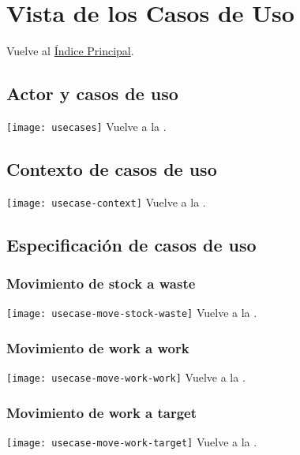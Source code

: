 \newpage{}
\section{Vista de los Casos de Uso}\label{usecasetoc}

\secttoc
Vuelve al \hyperlink{toc}{Índice Principal}.

\newpage{}
\subsection{Actor y casos de uso}
\texttt{[image: usecases]}
Vuelve a la .

\newpage{}
\subsection{Contexto de casos de uso}
\texttt{[image: usecase-context]}
Vuelve a la .

\newpage{}
\subsection{Especificación de casos de uso}

\subsubsection{Movimiento de stock a waste}
\texttt{[image: usecase-move-stock-waste]}
Vuelve a la .

\newpage{}
\subsubsection{Movimiento de work a work}
\texttt{[image: usecase-move-work-work]}
Vuelve a la .

\newpage{}
\subsubsection{Movimiento de work a target}
\texttt{[image: usecase-move-work-target]}
Vuelve a la .

